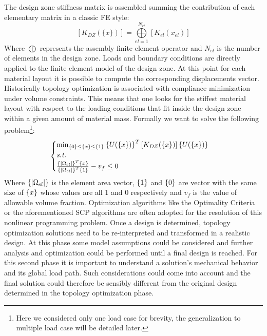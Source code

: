 The design zone stiffness matrix is assembled summing the contribution of each elementary matrix in a classic FE style:
\begin{equation}
\label{eq.8}
\left[K_{DZ}(\lbrace x\rbrace)\right]=\overset{N_{el}}{\underset{el=1}{\bigoplus}}\left[K_{el}(x_{el})\right]
\end{equation}
Where $\bigoplus$ represents the assembly finite element operator and $N_{el}$ is the number of elements in the design zone.
Loads and boundary conditions are directly applied to the finite element model of the design zone. At this point for each material layout it is possible to compute the corresponding displacements vector. Historically topology optimization is associated with compliance minimization under volume constraints. This means that one looks for the stiffest material layout with respect to the loading conditions that fit inside the design zone within a given amount of material mass.
Formally we want to solve the following problem\footnote{Here we considered only one load case for brevity, the generalization to multiple load case will be detailed later.}:
\begin{equation}
\label{compl_formulation}
\begin{cases}
\min_{\left\lbrace{0}\right \rbrace\leq\left\lbrace{x}\right \rbrace\leq\left\lbrace{1}\right \rbrace} {\left\lbrace{U(\lbrace x\rbrace)}\right \rbrace^T\left[K_{DZ}(\lbrace x\rbrace)\right]\left\lbrace{U(\lbrace x\rbrace)}\right \rbrace} \\
\textit{s.t.}\\
\frac{\left\lbrace{|\Omega_{el}|}\right \rbrace^T\left\lbrace{x}\right \rbrace}{\left\lbrace{|\Omega_{el}|}\right \rbrace^T\left\lbrace{1}\right \rbrace}-v_f\leq 0
\end{cases}
\end{equation}
Where $\left\lbrace{|\Omega_{el}|}\right \rbrace$ is the element area vector, $\left\lbrace{1}\right \rbrace$ and $\left\lbrace{0}\right \rbrace$ are vector with the same size of $\left\lbrace{x}\right \rbrace$ whose values are all 1 and 0 respectively and $v_f$ is the value of allowable volume fraction. Optimization algorithms like the Optimality Criteria \cite{bendsoe1995optimization} or the aforementioned SCP algorithms \cite{svanberg1987method} are often adopted for the resolution of this nonlinear programming problem. Once a design is determined, topology optimization solutions need to be re-interpreted and transformed in a realistic design. At this phase some model assumptions could be considered and further analysis and optimization could be performed until a final design is reached. For this second phase it is important to understand a solution's mechanical behavior and its global load path. Such considerations could come into account and the final solution could therefore be sensibly different from the original design determined in the topology optimization phase.
\clearpage
